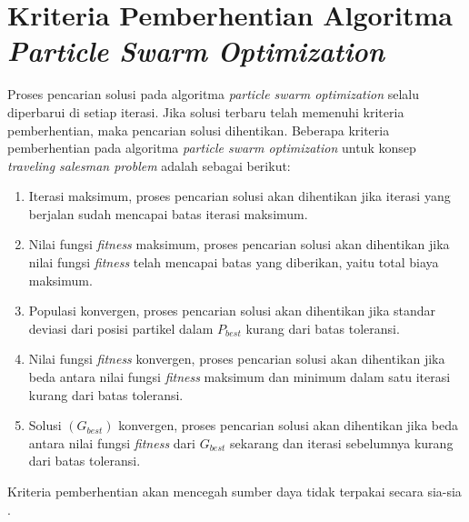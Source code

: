 \section{Kriteria Pemberhentian Algoritma \textit{Particle Swarm Optimization}}
\vspace{-4mm}
{\frenchspacing
    Proses pencarian solusi pada algoritma \textit{particle swarm optimization} selalu diperbarui di setiap iterasi.
    Jika solusi terbaru telah memenuhi kriteria pemberhentian, maka pencarian solusi dihentikan.
    Beberapa kriteria pemberhentian pada algoritma \textit{particle swarm optimization} untuk konsep \textit{traveling salesman problem} adalah sebagai berikut:

    \begin{enumerate}[align=left, left=0em, nolistsep]
        \item Iterasi maksimum, proses pencarian solusi akan dihentikan jika iterasi yang berjalan sudah mencapai batas iterasi maksimum.
        \item Nilai fungsi \textit{fitness} maksimum, proses pencarian solusi akan dihentikan jika nilai fungsi \textit{fitness} telah mencapai batas yang diberikan, yaitu total biaya maksimum.
        \item Populasi konvergen, proses pencarian solusi akan dihentikan jika standar deviasi dari posisi partikel dalam $P_{best}$ kurang dari batas toleransi.
        \item Nilai fungsi \textit{fitness} konvergen, proses pencarian solusi akan dihentikan jika beda antara nilai fungsi \textit{fitness} maksimum dan minimum dalam satu iterasi kurang dari batas toleransi.
        \item Solusi $(G_{best})$ konvergen, proses pencarian solusi akan dihentikan jika beda antara nilai fungsi \textit{fitness} dari $G_{best}$ sekarang dan iterasi sebelumnya kurang dari batas toleransi.
    \end{enumerate}

    \noindent
    Kriteria pemberhentian akan mencegah sumber daya tidak terpakai secara sia-sia .
}
\vspace{-3mm}


